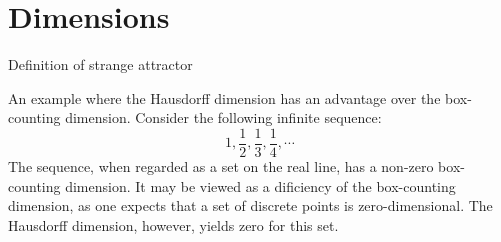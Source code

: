\documentclass[12pt,twoside]{book}
\begin{document}
\section{Dimensions}
Definition of strange attractor\citep[p.131]{ruelle}

An example where the Hausdorff dimension has an advantage over the box-counting dimension.
Consider the following infinite sequence:
\begin{equation*}
  1, \frac{1}{2}, \frac{1}{3}, \frac{1}{4}, \cdots
\end{equation*}
The sequence, when regarded as a set on the real line, has a non-zero box-counting dimension.
It may be viewed as a dificiency of the box-counting dimension, as one expects that
a set of discrete points is zero-dimensional.
The Hausdorff dimension, however, yields zero for this set.




\printindex
\end{document}
